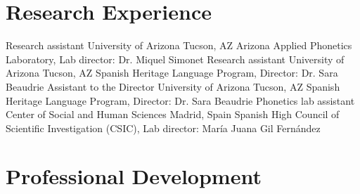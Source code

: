 \documentclass[11pt,letterpaper]{moderncv}
\begin{document}
\section{Research Experience}

        {Research assistant}
        {University of Arizona}
        {Tucson, AZ}
        {}
        {Arizona Applied Phonetics Laboratory, Lab director: Dr. Miquel Simonet}
        {Research assistant}
        {University of Arizona}
        {Tucson, AZ}
        {}
        {Spanish Heritage Language Program, Director: Dr. Sara Beaudrie}
        {Assistant to the Director}
        {University of Arizona}
        {Tucson, AZ}
        {}
        {Spanish Heritage Language Program, Director: Dr. Sara Beaudrie}
        {Phonetics lab assistant}
        {Center of Social and Human Sciences}
        {Madrid, Spain}
        {}
        {Spanish High Council of Scientific Investigation (CSIC), Lab director: Mar\'ia Juana Gil Fern\'andez}




\section{Professional Development}
\end{document}
